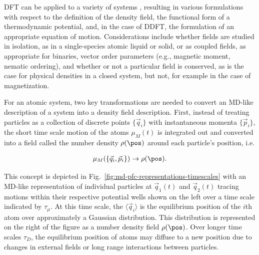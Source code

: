 DFT can be applied to a variety of systems \cite{jaric1988density, jones1985density}, resulting in various formulations with respect to the definition of the density field, the functional form of a thermodynamic potential, and, in the case of DDFT, the formulation of an appropriate equation of motion.  Considerations include whether fields are studied in isolation, as in a single-species atomic liquid or solid, or as coupled fields, as appropriate for binaries, vector order parameters (e.g., magnetic moment, nematic ordering), and whether or not a particular field is conserved, as is the case for physical densities in a closed system, but not, for example in the case of magnetization.

For an atomic system, two key transformations are needed to convert an MD-like description of a system into a density field description.  First, instead of treating particles as a collection of discrete points $\{\vec{q}_i\}$ with instantaneous momenta $\{\vec{p}_i \}$, the short time scale motion of the atoms $\mu_M(t)$ is integrated out and converted into a field called the number density $\rho(\pos)$ around each particle's position, i.e.

\begin{align}\label{eqn:md-to-field}
\mu_M(\{\vec{q}_i, \vec{p}_i \}) \rightarrow \rho(\pos).
\end{align}
%

This concept is depicted in Fig.~\ref{fig:md-pfc-representations-timescales} with an MD-like representation of individual particles at $\vec{q}_1(t)$ and $\vec{q}_2(t)$ tracing motions within their respective potential wells shown on the left over a time scale indicated by $\tau_\mu$.  At this time scale, the $\langle \vec{q}_i \rangle$ is the equilibrium position of the $i$th atom over approximately a Gaussian distribution.  This distribution is represented on the right of the figure as a number density field $\rho(\pos)$.  Over longer time scales $\tau_D$, the equilibrium position of atoms may diffuse to a new position due to changes in external fields or long range interactions between particles.

